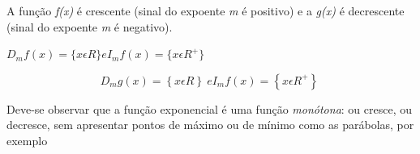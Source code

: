 \begin{texemplo}
	\item A função \textit{f(x)} é crescente (sinal do expoente \textit{m} é positivo) e a \textit{g(x)} é decrescente (sinal do expoente \textit{m} é negativo). 

	\item $D_{m} f(x) = \{ x  \epsilon  R \} e I_{m} f(x) = \{x \epsilon R^{+} \}$

 \[  \]  \[ D_{m}g \left( x \right) = \left\{ x  \epsilon  R \right\} ~ e I_{m}f \left( x \right) = \left\{ x  \epsilon  R^{+} \right\} ~  \] 

Deve-se observar que a função exponencial é uma função \textit{monótona}: ou cresce, ou decresce, sem apresentar pontos de máximo ou de mínimo como as parábolas, por exemplo \qedsymbol{}
\end{texemplo}

